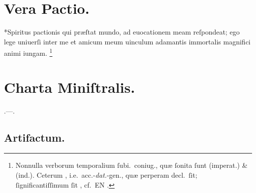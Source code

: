 \documentclass[12pt]{book}
\newcommand{\reconst}{*}
\begin{document}
\section{Vera Pactio.}\label{vera-pactio}
\reconst{}Spiritus pactionis qui præſtat mundo,
ad euocationem meam reſpondeat;
ego lege uniuerſi inter me et amicum meum
uinculum adamantis immortalis magnifici animi iungam.
%
\footnote{%
  Nonnulla verborum temporalium ſubi.\ coniug.,
  quæ ſonita ſunt  (imperat.) \&  (ind.).
  Ceterum , i.e.\ acc.-\emph{dat.}-gen.,
  quæ perperam decl.\ ſit;
  ſignificantiſſimum ſit
  ,
  cf.~EN .
}


\section{Charta Miniſtralis.}\label{charta-ministralis}
.---.

\subsection{Artifactum.}\label{artifactum}
\end{document}
